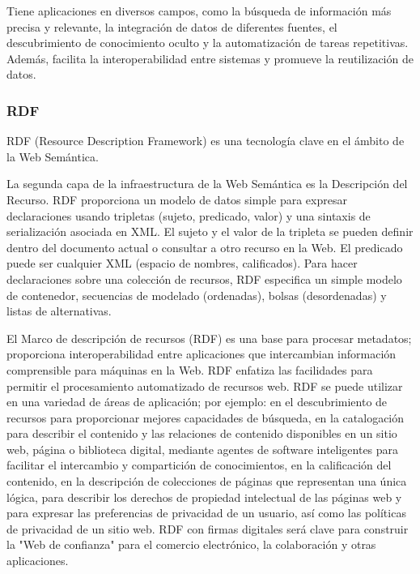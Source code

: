 \documentclass[12pt]{article}
\begin{document}
Tiene aplicaciones en diversos campos, como la búsqueda de información más precisa y relevante, la integración de datos de diferentes fuentes, el descubrimiento de conocimiento oculto y la automatización de tareas repetitivas. Además, facilita la interoperabilidad entre sistemas y promueve la reutilización de datos.

\subsubsection{RDF}

RDF (Resource Description Framework) es una tecnología clave en el ámbito de la Web Semántica.

La segunda capa de la infraestructura de la Web Semántica es la Descripción del Recurso. RDF proporciona un modelo de datos simple para expresar declaraciones usando tripletas (sujeto, predicado, valor) y una sintaxis de serialización asociada en XML. El sujeto y el valor de la tripleta se pueden definir dentro del documento actual o consultar a otro recurso en la Web. El predicado puede ser cualquier XML (espacio de nombres, calificados). Para hacer declaraciones sobre una colección de recursos, RDF especifica un simple modelo de contenedor, secuencias de modelado (ordenadas), bolsas (desordenadas) y listas de alternativas. \citep{ref10}

El Marco de descripción de recursos (RDF) es una base para procesar metadatos; proporciona interoperabilidad entre aplicaciones que intercambian información comprensible para máquinas en la Web. RDF enfatiza las facilidades para permitir el procesamiento automatizado de recursos web. RDF se puede utilizar en una variedad de áreas de aplicación; por ejemplo: en el descubrimiento de recursos para proporcionar mejores capacidades de búsqueda, en la catalogación para describir el contenido y las relaciones de contenido disponibles en un sitio web, página o biblioteca digital, mediante agentes de software inteligentes para facilitar el intercambio y compartición de conocimientos, en la calificación del contenido, en la descripción de colecciones de páginas que representan una única lógica, para describir los derechos de propiedad intelectual de las páginas web y para expresar las preferencias de privacidad de un usuario, así como las políticas de privacidad de un sitio web. RDF con firmas digitales será clave para construir la "Web de confianza" para el comercio electrónico, la colaboración y otras aplicaciones.
\citep{ref46}
\end{document}
